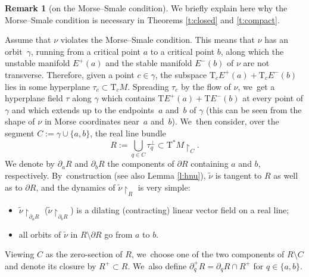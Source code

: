 \documentclass[10pt]{amsart}
\newcommand{\sT}{\mathrm{T}^\ast}
\newcommand{\rT}{\mathrm{T}}
\newcommand{\hnu}{\tilde\nu}
\newcommand{\de}{\mathrel{:=}}
\newcommand{\rst}[1]{{\upharpoonright}_{\!#1}}
\let\del\partial
\theoremstyle{plain}
\theoremstyle{definition}
\newtheorem{remark}[theorem]{Remark}
\begin{document}
\begin{remark}[on the Morse--Smale condition] \label{r:MS}
We briefly explain here why the Morse--Smale condition is necessary in Theorems
\ref{t:closed} and \ref{t:compact}.

Assume that $\nu$ violates the Morse--Smale condition. This means that $\nu$ has
an orbit~$\gamma$, running from a critical point $a$ to a critical point $b$,
along which the unstable manifold $E^+(a)$ and the stable manifold $E^-(b)$ of
$\nu$ are not transverse. Therefore, given a point $c \in \gamma$, the subspace
$\rT_cE^+(a) + \rT_cE^-(b)$ lies in some hyperplane \hbox{$\tau_c \subset \rT_cM$}.
Spreading $\tau_c$ by the flow of $\nu$, we~get a hyperplane field $\tau$ along
$\gamma$ which contains $\rT E^+(a) + \rT E^-(b)$ at every point of $\gamma$ and
which extends up to the endpoints~$a$ and~$b$ of $\gamma$ (this can be seen from
the shape of $\nu$ in Morse coordinates near~$a$ and~$b$). We~then consider,
over the segment $C \de \gamma \cup \{a,b\}$, the real line bundle
\[
R \de \bigcup_{q \in C} \tau_q^\bot \subset \sT M \rst C.
\]
We denote by $\del_aR$ and $\del_bR$ the components of $\del R$ containing $a$
and $b$, respectively. By~construction (see also Lemma \ref{l:hnu}), $\hnu$ is
tangent to $R$ as well as to $\del R$, and the dynamics of $\hnu \rst R$ is very
simple:
\begin{itemize}
\item
$\hnu \rst{ \del_aR }$ (\resp $\hnu \rst{ \del_bR }$) is a dilating (\resp contracting) linear vector field on a real line;
\item
all orbits of $\hnu$ in $R \setminus \del R$ go from $a$ to $b$.
\end{itemize}
Viewing $C$ as the zero-section of $R$, we~choose one of the two components of
$R \setminus C$ and denote its closure by $R^+ \subset R$. We~also define $\del_q^+R =
\del_qR \cap R^+$ for $q \in \{a,b\}$.


\end{remark}
\end{document}
